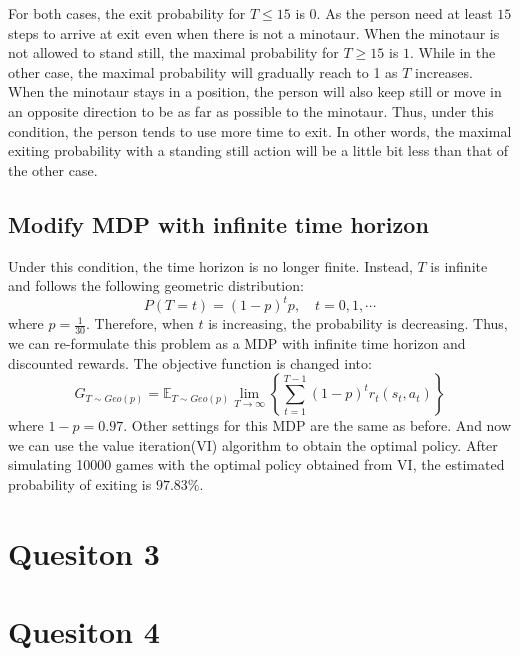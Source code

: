 \documentclass{article}
\begin{document}
For both cases, the exit probability for $T\leq 15$ is $0$. As the person need at least $15$ steps to arrive at exit even when there is not a minotaur.
When the minotaur is not allowed to stand still, the maximal probability for $T\geq 15$ is $1$. While in the other case, the maximal probability will gradually reach to 1 as $T$ increases.
When the minotaur stays in a position, the person will also keep still or move in an opposite direction to be as far as possible to the minotaur. 
Thus, under this condition, the person tends to use more time to exit. 
In other words, the maximal exiting probability with a standing still action will be a little bit less than that of the other case. 

\subsection{Modify MDP with infinite time horizon}
Under this condition, the time horizon is no longer finite. Instead, $T$ is infinite and follows the following geometric distribution:
$$P(T=t)=(1-p)^tp, \quad t=0,1,\cdots$$
where $p=\frac{1}{30}$. Therefore, when $t$ is increasing, the probability is decreasing. 
Thus, we can re-formulate this problem as a MDP with infinite time horizon and discounted rewards. The objective function is changed into:
$$G_{T\sim Geo(p)}=\mathbb{E}_{T\sim Geo(p)}\lim_{T\rightarrow\infty}\left\{\sum_{t=1}^{T-1}(1-p)^t r_t(s_t,a_t)\right\}$$
where $1-p=0.97$.
Other settings for this MDP are the same as before. And now we can use the value iteration(VI) algorithm to obtain the optimal policy.
After simulating 10000 games with the optimal policy obtained from VI, the estimated probability of exiting is $97.83\%$.

\section{Quesiton 3}

\section{Quesiton 4}
\end{document}
